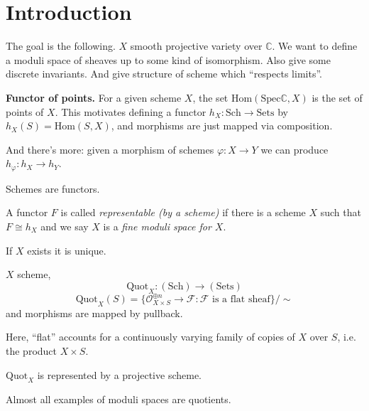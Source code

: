 \section{Introduction}
\label{section-introduction}

The goal is the following. $X$ smooth projective variety over $\mathbb{C}$. We
want to define a moduli space of sheaves up to some kind of isomorphism. Also
give some discrete invariants. And give structure of scheme which ``respects
limits''.

{\bf Functor of points.} For a given scheme $X$, the set
$\text{Hom}(\text{Spec}\mathbb{C},X)$ is the set of points of $X$. This motivates
defining a functor $h_X:\text{Sch}\to \text{Sets}$ by $h_X(S)=\text{Hom}(S,X)$,
and morphisms are just mapped via composition.

And there's more: given a morphism of schemes $\varphi:X\to Y$ we can produce
 $h_\varphi:h_X \to h_Y$.

\begin{slogan}
Schemes are functors.
\end{slogan}

\begin{definition}
\label{definition-representable-functor-by-scheme}
A functor $F$ is called {\it representable (by a scheme)} if there is a scheme
$X$ such that $F\cong h_X$ and we say $X$ is a {\it fine moduli space for $X$}.
\end{definition}

\begin{remark}
\label{remark-uniqueness-of-representable-functor}
If $X$ exists it is unique.
\end{remark}

\begin{example}
\label{example-quotient-sheaf}
$X$ scheme,
$$
\text{Quot}_X:(\text{Sch})\to (\text{Sets})
$$
$$
\text{Quot}_X(S)=\{
\mathcal{O}_{X \times S}^{\oplus n}\to\mathcal{F}
:\mathcal{F} \text{ is a flat sheaf}\}\Big/ \sim
$$
and morphisms are mapped by pullback.
\end{example}

Here, ``flat'' accounts for a continuously varying family of copies of $X$
over $S$, i.e. the product $X \times S$.

\begin{theorem}
\label{theorem-Quot-is-represented}
$\text{Quot}_X$ is represented by a projective scheme.
\end{theorem}

Almost all examples of moduli spaces are quotients.

